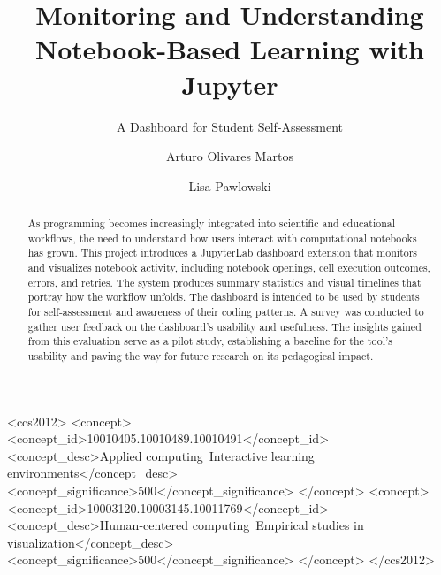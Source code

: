 \documentclass[manuscript,screen,review]{acmart}
\begin{document}
\title{Monitoring and Understanding Notebook-Based Learning with Jupyter}
\subtitle{A Dashboard for Student Self-Assessment}


\author{Arturo Olivares Martos}

\author{Lisa Pawlowski}


\begin{abstract}
  As programming becomes increasingly integrated into scientific and educational workflows, the need to understand how users interact with computational notebooks has grown. This project introduces a JupyterLab dashboard extension that monitors and visualizes notebook activity, including notebook openings, cell execution outcomes, errors, and retries. The system produces summary statistics and visual timelines that portray how the workflow unfolds. The dashboard is intended to be used by students for self-assessment and awareness of their coding patterns. A survey was conducted to gather user feedback on the dashboard's usability and usefulness. The insights gained from this evaluation serve as a pilot study, establishing a baseline for the tool's usability and paving the way for future research on its pedagogical impact.
\end{abstract}

\begin{CCSXML}
<ccs2012>
   <concept>
       <concept_id>10010405.10010489.10010491</concept_id>
       <concept_desc>Applied computing~Interactive learning environments</concept_desc>
       <concept_significance>500</concept_significance>
       </concept>
   <concept>
       <concept_id>10003120.10003145.10011769</concept_id>
       <concept_desc>Human-centered computing~Empirical studies in visualization</concept_desc>
       <concept_significance>500</concept_significance>
       </concept>
 </ccs2012>
\end{CCSXML}
\end{document}
